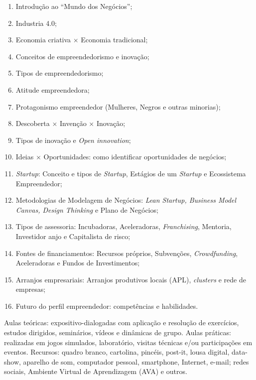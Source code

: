 \begin{pud}
	
	\programa
	\begin{enumerate}[itemsep=0em]
		\item Introdução ao  ``Mundo dos Negócios'';
		\item Industria 4.0;
		\item Economia criativa $\times$ Economia tradicional; 
		\item Conceitos de empreendedorismo e inovação;
		\item Tipos de empreendedorismo;
		\item Atitude empreendedora;
		\item Protagonismo empreendedor (Mulheres, Negros e outras minorias);
		\item Descoberta $\times$ Invenção $\times$ Inovação;
		\item Tipos de inovação e \textit{Open innovation}; 
		\item Ideias $\times$ Oportunidades: como identificar oportunidades de negócios;
		\item \textit{Startup}: Conceito e tipos de \textit{Startup}, Estágios de um \textit{Startup} e Ecossistema Empreendedor;
		\item Metodologias de Modelagem de Negócios: \textit{Lean Startup, Business Model Canvas, Design Thinking} e Plano de Negócios;
		\item Tipos de assessoria: Incubadoras, Aceleradoras, \textit{Franchising}, Mentoria, Investidor anjo e Capitalista de risco;
		\item Fontes de financiamentos: Recursos próprios, Subvenções, \textit{Crowdfunding}, Aceleradoras e Fundos de Investimentos; 
		\item Arranjos empresariais: Arranjos produtivos locais (APL), \textit{clusters} e rede de empresas;
		\item Futuro do perfil empreendedor: competências e habilidades.
		 
	\end{enumerate}
	
	
	\metodologia
	Aulas teóricas: expositivo-dialogadas com aplicação e resolução de exercícios, estudos dirigidos, seminários, vídeos e dinâmicas de grupo. Aulas práticas: realizadas em jogos simulados, laboratório, visitas técnicas e/ou participações em eventos. Recursos: quadro branco, cartolina, pincéis, post-it, lousa digital, data-show, aparelho de som, computador pessoal, smartphone, Internet, e-mail; redes sociais, Ambiente Virtual de Aprendizagem (AVA) e outros.
	

\end{pud}

